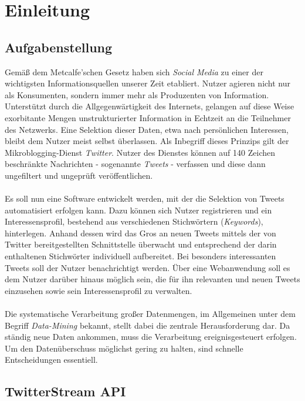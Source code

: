 \chapter{Einleitung}

\section{Aufgabenstellung}
Gemäß dem Metcalfe'schen Gesetz haben sich \textit{Social Media} zu einer der wichtigsten Informationsquellen unserer Zeit etabliert. Nutzer agieren nicht nur als Konsumenten, sondern immer mehr als Produzenten von Information. Unterstützt durch die Allgegenwärtigkeit des Internets, gelangen auf diese Weise exorbitante Mengen unstrukturierter Information in Echtzeit an die Teilnehmer des Netzwerks. Eine Selektion dieser Daten, etwa nach persönlichen Interessen, bleibt dem Nutzer meist selbst überlassen.
Als Inbegriff dieses Prinzips gilt der Mikroblogging-Dienst \textit{Twitter}. Nutzer des Dienstes können auf 140 Zeichen beschränkte Nachrichten - sogenannte \textit{Tweets} - verfassen und diese dann ungefiltert und ungeprüft veröffentlichen.\\\\
Es soll nun eine Software entwickelt werden, mit der die Selektion von Tweets automatisiert erfolgen kann. Dazu können sich Nutzer registrieren und ein Interessensprofil, bestehend aus verschiedenen Stichwörtern (\textit{Keywords}), hinterlegen. Anhand dessen wird das Gros an neuen Tweets mittels der von Twitter bereitgestellten Schnittstelle überwacht und entsprechend der darin enthaltenen Stichwörter individuell aufbereitet. Bei besonders interessanten Tweets soll der Nutzer benachrichtigt werden. Über eine Webanwendung soll es dem Nutzer darüber hinaus möglich sein, die für ihn relevanten und neuen Tweets einzusehen sowie sein Interessensprofil zu verwalten. \\\\
Die systematische Verarbeitung großer Datenmengen, im Allgemeinen unter dem Begriff \textit{Data-Mining} bekannt, stellt dabei die zentrale Herausforderung dar. Da ständig neue Daten ankommen, muss die Verarbeitung ereignisgesteuert erfolgen. Um den Datenüberschuss möglichst gering zu halten, sind schnelle Entscheidungen essentiell.
\section{TwitterStream API}
